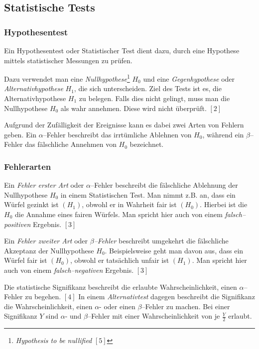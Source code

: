 \documentclass[12pt,a4paper]{scrartcl}
\numberwithin{equation}{section} %
\renewcommand{\[}{} %
\renewcommand{\]}{\noindent} %
\begin{document}
\hypertarget{statistische-tests}{%
\subsection{Statistische Tests}\label{statistische-tests}}

\hypertarget{hypothesentest}{%
\subsubsection{Hypothesentest}\label{hypothesentest}}

Ein Hypothesentest oder Statistischer Test dient dazu, durch eine
Hypothese mittels statistischer Messungen zu prüfen.

Dazu verwendet man eine \emph{Nullhypothese}\footnote{\emph{Hypothesis
  to be nullified} \([5]\)} \(H_0\) und eine \emph{Gegenhypothese} oder
\emph{Alternativhypothese} \(H_1\), die sich unterscheiden. Ziel des
Tests ist es, die Alternativhypothese \(H_1\) zu belegen. Falls dies
nicht gelingt, muss man die Nullhypothese \(H_0\) als wahr annehmen.
Diese wird nicht überprüft. \([2]\)

Aufgrund der Zufälligkeit der Ereignisse kann es dabei zwei Arten von
Fehlern geben. Ein \(\alpha\)--Fehler beschreibt das irrtümliche
Ablehnen von \(H_0\), während ein \(\beta\)--Fehler das fälschliche
Annehmen von \(H_0\) bezeichnet.

\hypertarget{fehlerarten}{%
\subsubsection{Fehlerarten}\label{fehlerarten}}

Ein \emph{Fehler erster Art} oder \(\alpha\)--Fehler beschreibt die
fälschliche Ablehnung der Nullhypothese \(H_0\) in einem Statistischen
Test. Man nimmt z.B. an, dass ein Würfel gezinkt ist \((H_1)\), obwohl
er in Wahrheit fair ist \((H_0)\). Hierbei ist die \(H_0\) die Annahme
eines fairen Würfels. Man spricht hier auch von einem
\emph{falsch--positiven} Ergebnis. \([3]\)

Ein \emph{Fehler zweiter Art} oder \emph{\(\beta\)--Fehler} beschreibt
umgekehrt die fälschliche Akzeptanz der Nullhypothese \(H_0\).
Beispielsweise geht man davon aus, dass ein Würfel fair ist \((H_0)\),
obwohl er tatsächlich unfair ist \((H_1)\). Man spricht hier auch von
einem \emph{falsch--negativen} Ergebnis. \([3]\)

Die statistische Signifikanz beschreibt die erlaubte Wahrscheinlichkeit,
einen \(\alpha\)--Fehler zu begehen. \([4]\) In einem
\emph{Alternativtest} dagegen beschreibt die Signifikanz die
Wahrscheinlichkeit, einen \(\alpha\)- oder einen \(\beta\)--Fehler zu
machen. Bei einer Signifikanz \(Y\) sind \(\alpha\)- und
\(\beta\)--Fehler mit einer Wahrscheinlichkeit von je \(\frac{Y}{2}\)
erlaubt.
\end{document}
